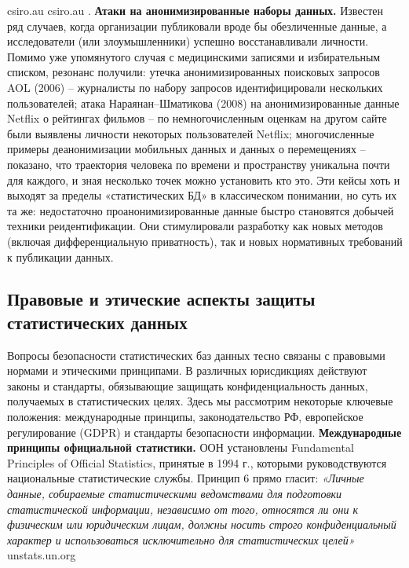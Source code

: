 csiro.au
csiro.au
. \textbf{Атаки на анонимизированные наборы данных.} Известен ряд случаев, когда организации публиковали вроде бы обезличенные данные, а исследователи (или злоумышленники) успешно восстанавливали личности. Помимо уже упомянутого случая с медицинскими записями и избирательным списком, резонанс получили: утечка анонимизированных поисковых запросов AOL (2006) – журналисты по набору запросов идентифицировали нескольких пользователей; атака Нараянан–Шматикова (2008) на анонимизированные данные Netflix о рейтингах фильмов – по немногочисленным оценкам на другом сайте были выявлены личности некоторых пользователей Netflix; многочисленные примеры деанонимизации мобильных данных и данных о перемещениях – показано, что траектория человека по времени и пространству уникальна почти для каждого, и зная несколько точек можно установить кто это. Эти кейсы хоть и выходят за пределы «статистических БД» в классическом понимании, но суть их та же: недостаточно проанонимизированные данные быстро становятся добычей техники реидентификации. Они стимулировали разработку как новых методов (включая дифференциальную приватность), так и новых нормативных требований к публикации данных. \subsection{Правовые и этические аспекты защиты статистических данных}
Вопросы безопасности статистических баз данных тесно связаны с правовыми нормами и этическими принципами. В различных юрисдикциях действуют законы и стандарты, обязывающие защищать конфиденциальность данных, получаемых в статистических целях. Здесь мы рассмотрим некоторые ключевые положения: международные принципы, законодательство РФ, европейское регулирование (GDPR) и стандарты безопасности информации. \textbf{Международные принципы официальной статистики.} ООН установлены Fundamental Principles of Official Statistics, принятые в 1994 г., которыми руководствуются национальные статистические службы. Принцип 6 прямо гласит: \textit{«Личные данные, собираемые статистическими ведомствами для подготовки статистической информации, независимо от того, относятся ли они к физическим или юридическим лицам, должны носить строго конфиденциальный характер и использоваться исключительно для статистических целей»}
unstats.un.org
